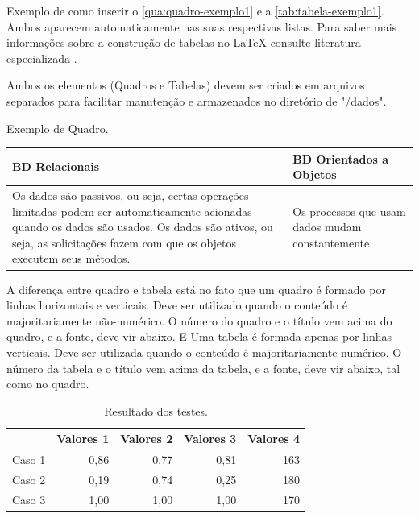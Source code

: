 Exemplo de como inserir o \autoref{qua:quadro-exemplo1} e a \autoref{tab:tabela-exemplo1}. Ambos aparecem automaticamente nas suas respectivas listas. Para saber mais informações sobre a construção de tabelas no \LaTeX{} consulte literatura especializada \cite{Mittelbach2004}.

Ambos os elementos (Quadros e Tabelas) devem ser criados em arquivos separados para facilitar manutenção e armazenados no diretório de "/dados".

\begin{quadro}[!htb]
    \centering
    \caption{Exemplo de Quadro.\label{qua:quadro-exemplo1}}
    \begin{tabular}{|p{7cm}|p{7cm}|}
        \hline
        \textbf{BD Relacionais} & \textbf{BD Orientados a Objetos} \\
        \hline
        Os dados são passivos, ou seja, certas operações limitadas podem ser automaticamente acionadas quando os dados são usados. Os dados são ativos, ou seja, as solicitações fazem com que os objetos executem seus métodos. & Os processos que usam dados mudam constantemente. \\
        \hline
    \end{tabular}
\end{quadro}


A diferença entre quadro e tabela está no fato que um quadro é formado por linhas horizontais e verticais. Deve ser utilizado quando o conteúdo é majoritariamente não-numérico. O número do quadro e o título vem acima do quadro, e a fonte, deve vir abaixo. E Uma tabela é formada apenas por linhas verticais. Deve ser utilizada quando o conteúdo é majoritariamente numérico. O número da tabela e o título vem acima da tabela, e a fonte, deve vir abaixo, tal como no quadro.

\begin{table}[!htb]
    \centering
    \caption[Resultado dos testes]{Resultado dos testes.
    \label{tab:tabela-exemplo1}}
    \begin{tabular}{rrrrr}
        \toprule
            & Valores 1 & Valores 2 & Valores 3 & Valores 4 \\
        \midrule
            Caso 1 & 0,86 & 0,77 & 0,81 & 163 \\
            Caso 2 & 0,19 & 0,74 & 0,25 & 180 \\
            Caso 3 & 1,00 & 1,00 & 1,00 & 170 \\
        \bottomrule
    \end{tabular}
\end{table}


